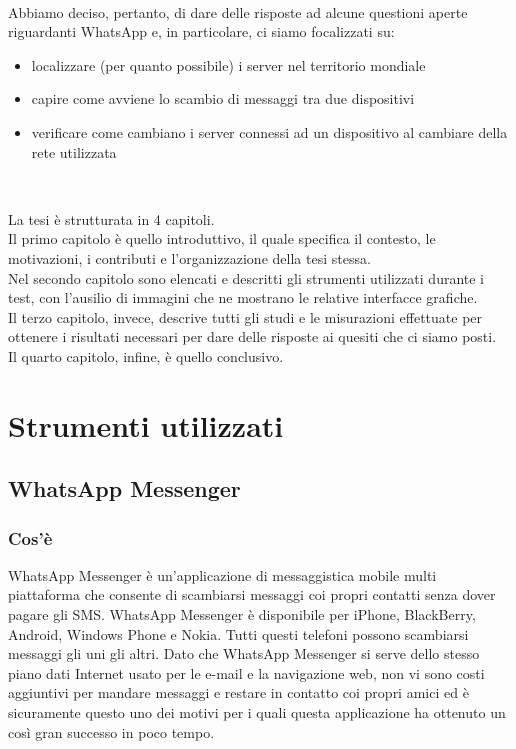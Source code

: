 \documentclass[a4paper,11pt]{book}
\begin{document}
~

Abbiamo deciso, pertanto, di dare delle risposte ad alcune questioni aperte riguardanti WhatsApp e, in particolare, ci siamo focalizzati su:
\begin{itemize}
 \item localizzare (per quanto possibile) i server nel territorio mondiale
 \item capire come avviene lo scambio di messaggi tra due dispositivi
 \item verificare come cambiano i server connessi ad un dispositivo al cambiare della rete utilizzata
\end{itemize}

~

La tesi \`e strutturata in 4 capitoli.\\
Il primo capitolo \`e quello introduttivo, il quale specifica il contesto, le motivazioni, i contributi e l'organizzazione della tesi stessa.\\
Nel secondo capitolo sono elencati e descritti gli strumenti utilizzati durante i test, con l'ausilio di immagini che ne mostrano le relative interfacce grafiche. \\
Il terzo capitolo, invece, descrive tutti gli studi e le misurazioni effettuate per ottenere i risultati necessari per dare delle risposte ai quesiti che ci siamo posti.\\
Il quarto capitolo, infine, \`e quello conclusivo.

\chapter{Strumenti utilizzati}

\section{WhatsApp Messenger}
\subsection{Cos'\`e}
WhatsApp Messenger \`e un'applicazione di messaggistica mobile multi piattaforma che consente di scambiarsi messaggi coi propri contatti senza dover pagare gli SMS. WhatsApp Messenger \`e disponibile per iPhone, BlackBerry, Android, Windows Phone e Nokia. Tutti questi telefoni possono scambiarsi messaggi gli uni gli altri. Dato che WhatsApp Messenger si serve dello stesso piano dati Internet usato per le e-mail e la navigazione web, non vi sono costi aggiuntivi per mandare messaggi e restare in contatto coi propri amici ed \`e sicuramente questo uno dei motivi per i quali questa applicazione ha ottenuto un cos\`i gran successo in poco tempo.
\end{document}
